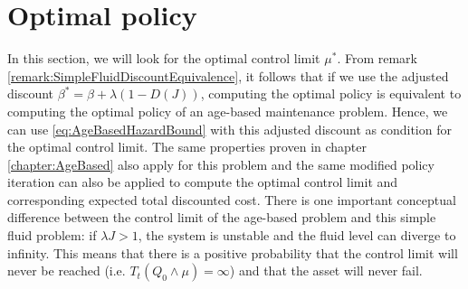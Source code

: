 \section{Optimal policy}
In this section, we will look for the optimal control limit $\mu^*$.
From remark \ref{remark:SimpleFluidDiscountEquivalence}, it follows that if we use the adjusted discount $\beta^*=\beta+\lambda(1-D(J))$, computing the optimal policy is equivalent to computing the optimal policy of an age-based maintenance problem.
Hence, we can use \eqref{eq:AgeBasedHazardBound} with this adjusted discount as condition for the optimal control limit.
The same properties proven in chapter \ref{chapter:AgeBased} also apply for this problem and the same modified policy iteration can also be applied to compute the optimal control limit and corresponding expected total discounted cost.
There is one important conceptual difference between the control limit of the age-based problem and this simple fluid problem:
if $\lambda J>1$, the system is unstable and the fluid level can diverge to infinity.
This means that there is a positive probability that the control limit will never be reached (i.e. $T_t(Q_0\wedge\mu)=\infty$) and that the asset will never fail.